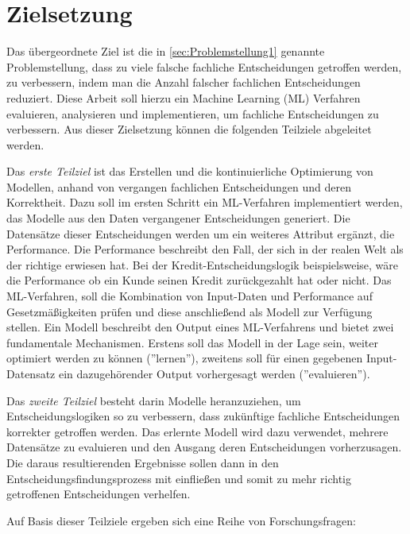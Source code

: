 \section{Zielsetzung}
\label{sec:Zielsetzung1}

Das übergeordnete Ziel ist die in \ref{sec:Problemstellung1} genannte Problemstellung, dass zu viele falsche fachliche Entscheidungen getroffen werden, zu verbessern, indem man die Anzahl falscher fachlichen Entscheidungen reduziert. Diese Arbeit soll hierzu ein Machine Learning (ML) Verfahren evaluieren, analysieren und implementieren, um fachliche Entscheidungen zu verbessern. Aus dieser Zielsetzung können die folgenden Teilziele abgeleitet werden. 

Das \textit{erste Teilziel} ist das Erstellen und die kontinuierliche Optimierung von Modellen, anhand von vergangen fachlichen Entscheidungen und deren Korrektheit. Dazu soll im ersten Schritt ein ML-Verfahren implementiert werden, das Modelle aus den Daten vergangener Entscheidungen generiert. Die Datensätze dieser Entscheidungen werden um ein weiteres Attribut ergänzt, die Performance. Die Performance beschreibt den Fall, der sich in der realen Welt als der richtige erwiesen hat. Bei der Kredit-Entscheidungslogik beispielsweise, wäre die Performance ob ein Kunde seinen Kredit zurückgezahlt hat oder nicht. Das ML-Verfahren, soll die Kombination von Input-Daten und Performance auf Gesetzmäßigkeiten prüfen und diese anschließend als Modell zur Verfügung stellen. Ein Modell beschreibt den Output eines ML-Verfahrens und bietet zwei fundamentale Mechanismen. Erstens soll das Modell in der Lage sein, weiter optimiert werden zu können (''lernen''), zweitens soll für einen gegebenen Input-Datensatz ein dazugehörender Output vorhergesagt werden (''evaluieren''). 

Das \textit{zweite Teilziel} besteht darin Modelle heranzuziehen, um Entscheidungslogiken so zu verbessern, dass zukünftige fachliche Entscheidungen korrekter getroffen werden. Das erlernte Modell wird  dazu verwendet, mehrere Datensätze zu evaluieren und den Ausgang deren Entscheidungen vorherzusagen. Die daraus resultierenden Ergebnisse sollen dann in den Entscheidungsfindungsprozess mit einfließen und somit zu mehr richtig getroffenen Entscheidungen verhelfen. 

Auf Basis dieser Teilziele ergeben sich eine Reihe von Forschungsfragen: 


